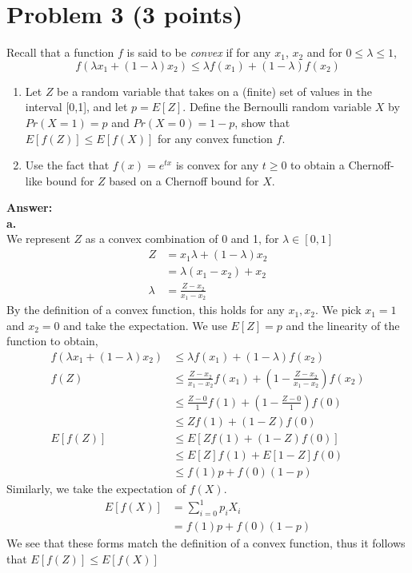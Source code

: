 \documentclass[letterpaper, 11pt]{article}
\begin{document}
\section*{Problem 3 (3 points)}
Recall that a function $f$ is said to be \emph{convex} if for any $x_1$, $x_2$ and for $0 \leq \lambda \leq 1$,
$$f(\lambda x_1 + (1-\lambda)x_2) \leq \lambda f(x_1) + (1-\lambda)f(x_2)$$
\begin{enumerate}
	\item Let $Z$ be a random variable that takes on a (finite) set of values in the interval [0,1], and let $p=E[Z]$. Define the Bernoulli random variable $X$ by $Pr(X=1)=p$ and $Pr(X=0)=1-p$, show that $E[f(Z)] \leq E[f(X)]$ for any convex function $f$.
	\item Use the fact that $f(x) = e^{tx}$ is convex for any $t \geq 0$ to obtain a Chernoff-like bound for $Z$ based on a Chernoff bound for $X$.
\end{enumerate}
\textbf{Answer:} \\
\textbf{a.} \\
We represent $Z$ as a convex combination of 0 and 1, for $\lambda \in [0,1]$
\begin{align*}
Z &= x_1\lambda + (1-\lambda)x_2 \\
 &= \lambda(x_1-x_2) + x_2 \\
 \lambda &= \frac{Z-x_2}{x_1-x_2}
\end{align*}
By the definition of a convex function, this holds for any $x_1, x_2$. We pick $x_1 = 1$ and $x_2=0$ and take the expectation. We use $E[Z] = p$ and the linearity of the function to obtain,
\begin{align*}
f(\lambda x_1 + (1-\lambda)x_2) &\leq \lambda f(x_1) + (1-\lambda)f(x_2) \\
f(Z) &\leq \frac{Z-x_2}{x_1-x_2} f(x_1) + \left(1-\frac{Z-x_2}{x_1-x_2}\right)f(x_2)\\
&\leq  \frac{Z-0}{1} f(1) + \left(1-\frac{Z-0}{1}\right)f(0) \\
&\leq Zf(1) + (1-Z)f(0) \\
E[f(Z)] &\leq E[Zf(1) + (1-Z)f(0)] \\
&\leq E[Z]f(1) + E[1-Z]f(0) \\
&\leq f(1)p + f(0)(1-p)
\end{align*}
Similarly, we take the expectation of $f(X)$.
\begin{align*}
E[f(X)] &= \sum_{i=0}^1 p_i X_i \\
&= f(1)p + f(0)(1-p)
\end{align*}
We see that these forms match the definition of a convex function, thus it follows that $E[f(Z)] \leq E[f(X)]$
\end{document}
